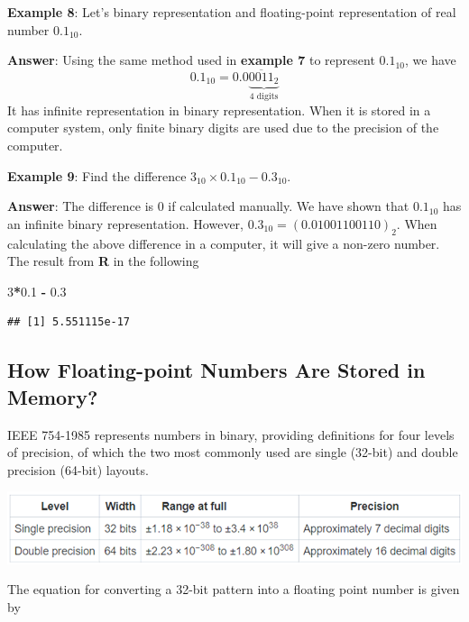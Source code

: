 \documentclass[
]{book}
\newenvironment{Shaded}{\begin{snugshade}}{\end{snugshade}}
\newcommand{\DecValTok}[1]{\textcolor[rgb]{0.00,0.00,0.81}{#1}}
\newcommand{\FloatTok}[1]{\textcolor[rgb]{0.00,0.00,0.81}{#1}}
\newcommand{\SpecialCharTok}[1]{\textcolor[rgb]{0.81,0.36,0.00}{\textbf{#1}}}
\begin{document}
\textbf{Example 8}: Let's binary representation and floating-point representation of real number \(0.1_{10}\).

\textbf{Answer}: Using the same method used in \textbf{example 7} to represent \(0.1_{10}\), we have \[
0.1_{10} = 0.0\underbrace{\overline{0011}_2}_\text{4 digits}
\] It has infinite representation in binary representation. When it is stored in a computer system, only finite binary digits are used due to the precision of the computer.

\textbf{Example 9}: Find the difference \(3_{10}\times0.1_{10} - 0.3_{10}\).

\textbf{Answer}: The difference is 0 if calculated manually. We have shown that \(0.1_{10}\) has an infinite binary representation. However, \(0.3_{10} = (0.01001100110)_2\). When calculating the above difference in a computer, it will give a non-zero number. The result from \textbf{R} in the following

\begin{Shaded}
\begin{Highlighting}[]
\DecValTok{3}\SpecialCharTok{*}\FloatTok{0.1} \SpecialCharTok{{-}} \FloatTok{0.3}
\end{Highlighting}
\end{Shaded}

\begin{verbatim}
## [1] 5.551115e-17
\end{verbatim}

\hypertarget{how-floating-point-numbers-are-stored-in-memory}{%
\subsection{How Floating-point Numbers Are Stored in Memory?}\label{how-floating-point-numbers-are-stored-in-memory}}

IEEE 754-1985 represents numbers in binary, providing definitions for four levels of precision, of which the two most commonly used are single (32-bit) and double precision (64-bit) layouts.

\begin{center}\includegraphics[width=0.85\linewidth]{img02/w02-32bit64bitPattern} \end{center}

The equation for converting a 32-bit pattern into a floating point number is given by
\end{document}
